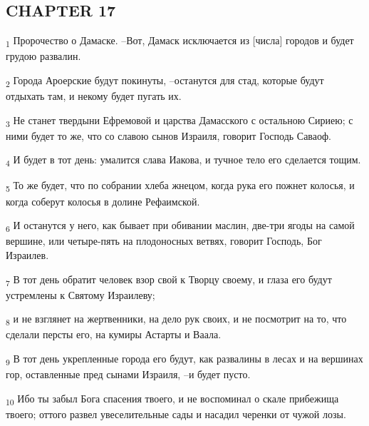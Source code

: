 \subsection{CHAPTER 17}
\begin{tcolorbox}
\textsubscript{1} Пророчество о Дамаске. --Вот, Дамаск исключается из [числа] городов и будет грудою развалин.
\end{tcolorbox}
\begin{tcolorbox}
\textsubscript{2} Города Ароерские будут покинуты, --останутся для стад, которые будут отдыхать там, и некому будет пугать их.
\end{tcolorbox}
\begin{tcolorbox}
\textsubscript{3} Не станет твердыни Ефремовой и царства Дамасского с остальною Сириею; с ними будет то же, что со славою сынов Израиля, говорит Господь Саваоф.
\end{tcolorbox}
\begin{tcolorbox}
\textsubscript{4} И будет в тот день: умалится слава Иакова, и тучное тело его сделается тощим.
\end{tcolorbox}
\begin{tcolorbox}
\textsubscript{5} То же будет, что по собрании хлеба жнецом, когда рука его пожнет колосья, и когда соберут колосья в долине Рефаимской.
\end{tcolorbox}
\begin{tcolorbox}
\textsubscript{6} И останутся у него, как бывает при обивании маслин, две-три ягоды на самой вершине, или четыре-пять на плодоносных ветвях, говорит Господь, Бог Израилев.
\end{tcolorbox}
\begin{tcolorbox}
\textsubscript{7} В тот день обратит человек взор свой к Творцу своему, и глаза его будут устремлены к Святому Израилеву;
\end{tcolorbox}
\begin{tcolorbox}
\textsubscript{8} и не взглянет на жертвенники, на дело рук своих, и не посмотрит на то, что сделали персты его, на кумиры Астарты и Ваала.
\end{tcolorbox}
\begin{tcolorbox}
\textsubscript{9} В тот день укрепленные города его будут, как развалины в лесах и на вершинах гор, оставленные пред сынами Израиля, --и будет пусто.
\end{tcolorbox}
\begin{tcolorbox}
\textsubscript{10} Ибо ты забыл Бога спасения твоего, и не воспоминал о скале прибежища твоего; оттого развел увеселительные сады и насадил черенки от чужой лозы.
\end{tcolorbox}
